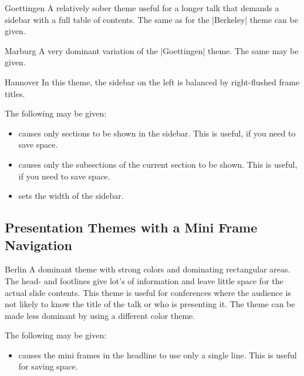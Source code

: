 \begin{themeexample}{Goettingen}
  A relatively sober theme useful for a longer talk that demands a
  sidebar with a full table of contents.  The same  as
  for the |Berkeley| theme can be given. 
\end{themeexample}

\begin{themeexample}{Marburg}
  A very dominant variation of the |Goettingen| theme. The same
   may be given.
\end{themeexample}

\begin{themeexample}{Hannover}
  In this theme, the sidebar on the left is balanced by
  right-flushed frame titles.
    
  The following  may be given:
  \begin{itemize}
  \item {} causes only sections to be
    shown in the sidebar. This is useful, if you need to save
    space.
  \item {} causes only the subsections
    of the current section to be shown. This is useful, if you need to
    save  space.      
  \item {} sets the width of the
    sidebar.
  \end{itemize}
\end{themeexample}




\subsection{Presentation Themes with a Mini Frame Navigation}

\begin{themeexample}{Berlin}
  A dominant theme with strong colors and dominating rectangular
  areas. The head- and footlines give lot's of information and leave
  little space for the actual slide contents. This theme is useful for
  conferences where the audience is not likely to know the title of
  the talk or who is presenting it.  The theme can be made less
  dominant by using a different color theme.
  
  The following  may be given:
  \begin{itemize}
  \item {} causes the mini frames in the headline to
    use only a single line. This is useful for saving space.
  \end{itemize}
\end{themeexample}

